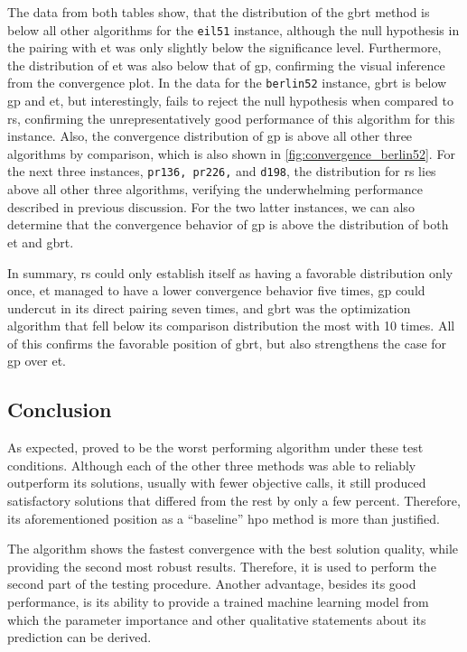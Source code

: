 The data from both tables show, that the distribution of the \gls{gbrt} method is below all other algorithms for the \texttt{eil51} instance, although the null hypothesis in the pairing with \gls{et} was only slightly below the significance level. Furthermore, the distribution of \gls{et} was also below that of \gls{gp}, confirming the visual inference from the convergence plot. 
In the data for the \texttt{berlin52} instance, \gls{gbrt} is below \gls{gp} and \gls{et}, but interestingly, fails to reject the null hypothesis when compared to \gls{rs}, confirming the unrepresentatively good performance of this algorithm for this instance. Also, the convergence distribution of \gls{gp} is above all other three algorithms by comparison, which is also shown in \cref{fig:convergence_berlin52}.
For the next three instances, \texttt{pr136, pr226,} and \texttt{d198}, the distribution for \gls{rs} lies above all other three algorithms, verifying the underwhelming performance described in previous discussion. For the two latter instances, we can also determine that the convergence behavior of \gls{gp} is above the distribution of both \gls{et} and \gls{gbrt}.

In summary, \gls{rs} could only establish itself as having a favorable distribution only once, \gls{et} managed to have a lower convergence behavior five times, \gls{gp} could undercut in its direct pairing seven times, and \gls{gbrt} was the optimization algorithm that fell below its comparison distribution the most with 10 times. All of this confirms the favorable position of \gls{gbrt}, but also strengthens the case for \gls{gp} over \gls{et}.

\subsection{Conclusion}

As expected,  proved to be the worst performing algorithm under these test conditions. Although each of the other three methods was able to reliably outperform its solutions, usually with fewer objective calls, it still produced satisfactory solutions that differed from the rest by only a few percent. Therefore, its aforementioned position as a \enquote{baseline} \gls{hpo} method is more than justified.

The  algorithm shows the fastest convergence with the best solution quality, while providing the second most robust results. Therefore, it is used to perform the second part of the testing procedure. Another advantage, besides its good performance, is its ability to provide a trained machine learning model from which the parameter importance and other qualitative statements about its prediction can be derived.

